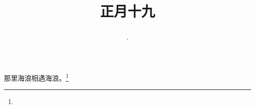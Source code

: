 \title{\date[d=28,m=2,y=2024][year:cn-y,年,month:cn,day:cn,日,·,weekday]·正月十九 }
那里海浪相遇海浪。\footnote{ }

